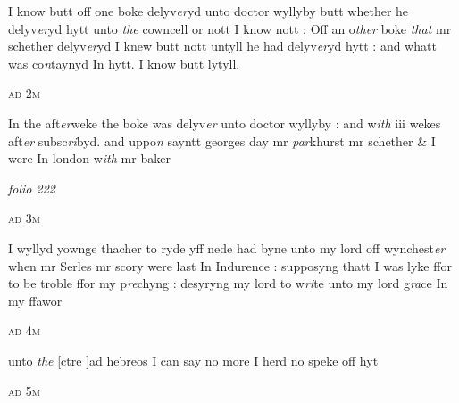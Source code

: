 \documentclass[12pt, a4paper]{book}
\begin{document}
		\ifthenelse{\isodd{\thepage}}
		{\reversemarginpar}
		{\normalmarginpar}
		I know butt off one boke delyv\textit{er}yd unto doctor wyllyby
butt whether he delyv\textit{er}yd hytt unto \textit{the} cowncell or nott I know
nott : Off an o\textit{ther} boke \textit{that} mr schether delyv\textit{er}yd I knew
butt nott untyll he had delyv\textit{er}yd hytt : and whatt was
co\textit{n}taynyd In hytt. I know butt lytyll.

				\begin{center} \begin{large} {\scshape ad 2m} \end{large} \end{center}
			

		\ifthenelse{\isodd{\thepage}}
		{\reversemarginpar}
		{\normalmarginpar}
		In the aft\textit{er}weke the boke was delyv\textit{er} unto doctor wyllyby : and w\textit{ith}
iii wekes aft\textit{er} subsc\textit{ri}byd. and uppo\textit{n} sayntt georges day mr \textit{par}khurst
mr schether \& I were In london w\textit{ith} mr baker

\dotfill
						\newpage
{}

\textit{folio 222}



				\begin{center} \begin{large} {\scshape ad 3m} \end{large} \end{center}
			
 	
		\ifthenelse{\isodd{\thepage}}
		{\reversemarginpar}
		{\normalmarginpar}
		I wyllyd yownge thacher to ryde yff nede had byne unto
my lord off wynchest\textit{er} when mr Serles mr scory were last
In Indurence : supposyng thatt I was lyke ffor to be troble
ffor my p\textit{re}chyng : desyryng my lord to w\textit{ri}te unto my lord
g\textit{ra}ce In my ffawor

				\begin{center} \begin{large} {\scshape ad 4m} \end{large} \end{center}
			

		\ifthenelse{\isodd{\thepage}}
		{\reversemarginpar}
		{\normalmarginpar}
		unto \textit{the}
               [ctre ]ad hebreos I can say no more I herd no
speke off hyt

				\begin{center} \begin{large} {\scshape ad 5m} \end{large} \end{center}
			
\end{document}
